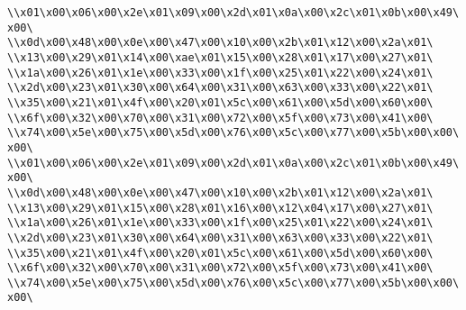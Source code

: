 \verb|\\x01\x00\x06\x00\x2e\x01\x09\x00\x2d\x01\x0a\x00\x2c\x01\x0b\x00\x49\x00\|\newline
\verb|\\x0d\x00\x48\x00\x0e\x00\x47\x00\x10\x00\x2b\x01\x12\x00\x2a\x01\|\newline
\verb|\\x13\x00\x29\x01\x14\x00\xae\x01\x15\x00\x28\x01\x17\x00\x27\x01\|\newline
\verb|\\x1a\x00\x26\x01\x1e\x00\x33\x00\x1f\x00\x25\x01\x22\x00\x24\x01\|\newline
\verb|\\x2d\x00\x23\x01\x30\x00\x64\x00\x31\x00\x63\x00\x33\x00\x22\x01\|\newline
\verb|\\x35\x00\x21\x01\x4f\x00\x20\x01\x5c\x00\x61\x00\x5d\x00\x60\x00\|\newline
\verb|\\x6f\x00\x32\x00\x70\x00\x31\x00\x72\x00\x5f\x00\x73\x00\x41\x00\|\newline
\verb|\\x74\x00\x5e\x00\x75\x00\x5d\x00\x76\x00\x5c\x00\x77\x00\x5b\x00\x00\x00\|\newline
\verb|\\x01\x00\x06\x00\x2e\x01\x09\x00\x2d\x01\x0a\x00\x2c\x01\x0b\x00\x49\x00\|\newline
\verb|\\x0d\x00\x48\x00\x0e\x00\x47\x00\x10\x00\x2b\x01\x12\x00\x2a\x01\|\newline
\verb|\\x13\x00\x29\x01\x15\x00\x28\x01\x16\x00\x12\x04\x17\x00\x27\x01\|\newline
\verb|\\x1a\x00\x26\x01\x1e\x00\x33\x00\x1f\x00\x25\x01\x22\x00\x24\x01\|\newline
\verb|\\x2d\x00\x23\x01\x30\x00\x64\x00\x31\x00\x63\x00\x33\x00\x22\x01\|\newline
\verb|\\x35\x00\x21\x01\x4f\x00\x20\x01\x5c\x00\x61\x00\x5d\x00\x60\x00\|\newline
\verb|\\x6f\x00\x32\x00\x70\x00\x31\x00\x72\x00\x5f\x00\x73\x00\x41\x00\|\newline
\verb|\\x74\x00\x5e\x00\x75\x00\x5d\x00\x76\x00\x5c\x00\x77\x00\x5b\x00\x00\x00\|\newline
